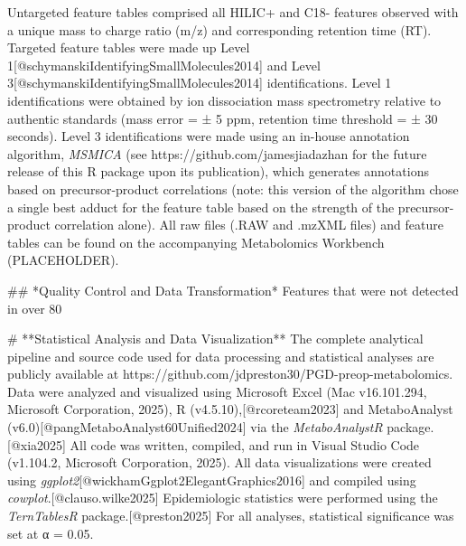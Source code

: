 \noindent\hspace{1.5em}Untargeted feature tables comprised all HILIC+ and C18- features observed with a unique mass to charge ratio (m/z) and corresponding retention time (RT). Targeted feature tables were made up Level 1[@schymanskiIdentifyingSmallMolecules2014] and Level 3[@schymanskiIdentifyingSmallMolecules2014] identifications. Level 1 identifications were obtained by ion dissociation mass spectrometry relative to authentic standards (mass error = ± 5 ppm, retention time threshold = ± 30 seconds). Level 3 identifications were made using an in-house annotation algorithm, \textit{MSMICA} (see https://github.com/jamesjiadazhan for the future release of this R package upon its publication), which generates annotations based on precursor-product correlations (note: this version of the algorithm chose a single best adduct for the feature table based on the strength of the precursor-product correlation alone).
All raw files (.RAW and .mzXML files) and feature tables can be found on the accompanying Metabolomics Workbench (PLACEHOLDER).

## *Quality Control and Data Transformation*
Features that were not detected in over 80%

# **Statistical Analysis and Data Visualization**
The complete analytical pipeline and source code used for data processing and statistical analyses are publicly available at https://github.com/jdpreston30/PGD-preop-metabolomics. Data were analyzed and visualized using Microsoft Excel (Mac v16.101.294, Microsoft Corporation, 2025), R (v4.5.10),[@rcoreteam2023] and MetaboAnalyst (v6.0)[@pangMetaboAnalyst60Unified2024] via the \textit{MetaboAnalystR} package.[@xia2025] All code was written, compiled, and run in Visual Studio Code (v1.104.2, Microsoft Corporation, 2025). All data visualizations were created using \textit{ggplot2}[@wickhamGgplot2ElegantGraphics2016] and compiled using \textit{cowplot}.[@clauso.wilke2025] Epidemiologic statistics were performed using the \textit{TernTablesR} package.[@preston2025] For all analyses, statistical significance was set at α = 0.05.

